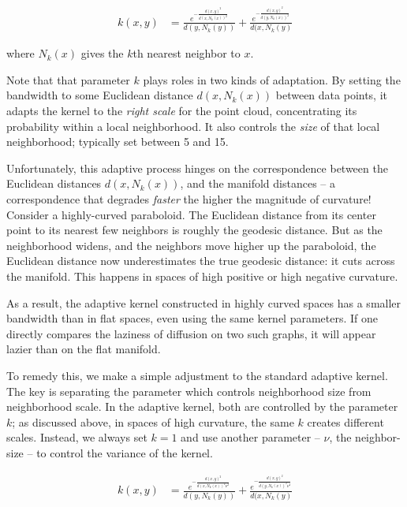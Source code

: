 \documentclass[
  letterpaper,
  DIV=11,
  numbers=noendperiod]{scrartcl}
\theoremstyle{plain}
\theoremstyle{definition}
\theoremstyle{plain}
\theoremstyle{definition}
\theoremstyle{plain}
\theoremstyle{remark}
\begin{document}
\[
\begin{aligned}
k(x, y) & =\frac{e^{-\frac{d(x, y)^2}{d(x, N_{k}(x))^2}}}{d(y, N_{k}(y))}
+\frac{e^{-\frac{d(x, y)^2}{d(y, N_{k}(x))^2}}}{d(x, N_{k}(y)}
\end{aligned}
\]

where \(N_{k}(x)\) gives the \(k\)th nearest neighbor to \(x\).

Note that that parameter \(k\) plays roles in two kinds of adaptation.
By setting the bandwidth to some Euclidean distance \(d(x,N_{k}(x))\)
between data points, it adapts the kernel to the \emph{right scale} for
the point cloud, concentrating its probability within a local
neighborhood. It also controls the \emph{size} of that local
neighborhood; typically set between 5 and 15.

Unfortunately, this adaptive process hinges on the correspondence
between the Euclidean distances \(d(x,N_{k}(x))\), and the manifold
distances -- a correspondence that degrades \emph{faster} the higher the
magnitude of curvature! Consider a highly-curved paraboloid. The
Euclidean distance from its center point to its nearest few neighbors is
roughly the geodesic distance. But as the neighborhood widens, and the
neighbors move higher up the paraboloid, the Euclidean distance now
underestimates the true geodesic distance: it cuts across the manifold.
This happens in spaces of high positive or high negative curvature.

As a result, the adaptive kernel constructed in highly curved spaces has
a smaller bandwidth than in flat spaces, even using the same kernel
parameters. If one directly compares the laziness of diffusion on two
such graphs, it will appear lazier than on the flat manifold.

To remedy this, we make a simple adjustment to the standard adaptive
kernel. The key is separating the parameter which controls neighborhood
size from neighborhood scale. In the adaptive kernel, both are
controlled by the parameter \(k\); as discussed above, in spaces of high
curvature, the same \(k\) creates different scales. Instead, we always
set \(k = 1\) and use another parameter -- \(\nu\), the neighbor-size --
to control the variance of the kernel.

\[
\begin{aligned}
k(x, y) & =\frac{e^{-\frac{d(x, y)^2}{d(x, N_{k}(x))^2\nu^2}}}{d(y, N_{k}(y))}
+\frac{e^{-\frac{d(x, y)^2}{d(y, N_{k}(x))^2\nu^2}}}{d(x, N_{k}(y)}
\end{aligned}
\]
\end{document}
